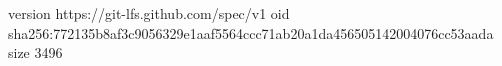 version https://git-lfs.github.com/spec/v1
oid sha256:772135b8af3c9056329e1aaf5564ccc71ab20a1da456505142004076cc53aada
size 3496

